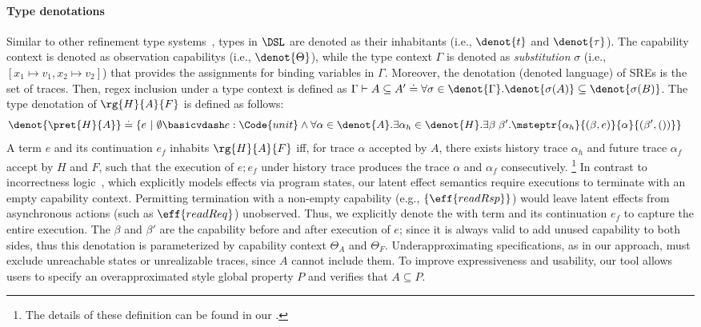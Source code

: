 \paragraph{Type denotations} Similar to other refinement type systems~\cite{JV21},
types in $\DSL$ are denoted as their inhabitants (i.e., $\denot{t}$ and $\denot{\tau}$).  The capability context is denoted as  observation capabilitys (i.e., $\denot{\Theta}$), while the type context $\Gamma$ is denoted as \emph{substitution} $\sigma$ (i.e., $[x_1\mapsto v_1, x_2\mapsto v_2]$) that provides the assignments for binding variables in $\Gamma$. Moreover, the denotation (denoted language) of SREs is the set of traces. Then, regex
inclusion under a type context is defined as $\Gamma \vdash A \subseteq
A' \doteq \forall \sigma \in \denot{\Gamma}. \denot{\sigma(A)}
\subseteq \denot{\sigma(B)}$.
The type denotation of $\rg{H}{A}{F}$ is defined as follows:
{\small\begin{align*}
  &\denot{\pret{H}{A}} \doteq \{e ~|~ \emptyset \basicvdash e : \Code{unit} \land \forall \alpha \in \denot{A}. \exists \alpha_h \in\denot{H}. \exists \beta\;\beta'. \msteptr{\alpha_h}{(\beta, e)}{\alpha}{(\beta',  ())} \}
\end{align*}}\noindent
A term $e$ and its continuation $e_f$ inhabits $\rg{H}{A}{F}$ iff, for trace $\alpha$ accepted by $A$, there exists history trace $\alpha_h$ and future trace $\alpha_f$ accept by $H$ and $F$, such that the execution of $e;e_f$ under history trace produces the trace $\alpha $ and $\alpha_f$ consecutively.
\footnote{The details of these definition can be found in our \techreport{}.} 
In contrast to incorrectness logic~\cite{OHP19}, which explicitly models effects via program states, our latent effect semantics require executions to terminate with an empty capability context. Permitting termination with a non-empty capability (e.g., $\{\eff{readRsp}\}$) would leave latent effects from asynchronous actions (such as $\eff{readReq}$) unobserved. Thus, we explicitly denote the \tyName with term and its continuation $e_f$ to capture the entire execution. The $\beta$ and $\beta'$ are the capability before and after execution of $e$; since it is always valid to add unused capability to both sides, thus this denotation is parameterized by capability context $\Theta_A$ and $\Theta_F$.
Underapproximating specifications, as in our approach, must exclude unreachable states or unrealizable traces, since $A$ cannot include them. To improve expressiveness and usability, our tool allows users to specify an overapproximated style global property $P$ and verifies that $A \subseteq P$.

